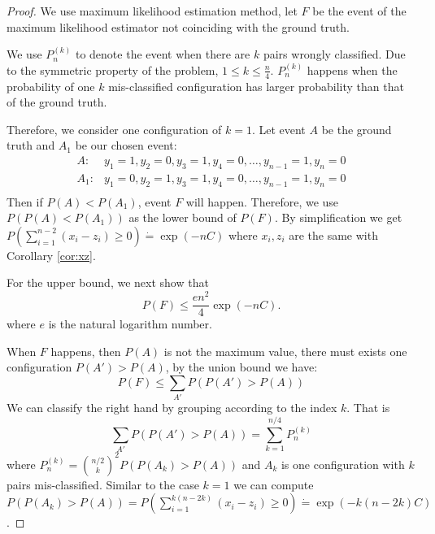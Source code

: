\documentclass{article}
\begin{document}
\begin{proof}
	We use maximum likelihood estimation method, let $F$ be the event of the maximum likelihood estimator not coinciding with the ground truth. 
	
	We use $P_n^{(k)}$ to denote the event when there are $k$ pairs wrongly classified. Due to the symmetric property of the problem, $1\leq k \leq \frac{n}{4}$.
	$P_n^{(k)}$ happens when the probability of one $k$ mis-classified configuration has larger probability than that of the ground truth. 
	
	Therefore, we consider one configuration of $k=1$. Let event $A$ be the ground truth and $A_1$ be our chosen event:
	\begin{align*}
	A: & y_1 = 1, y_2 = 0, y_3 = 1, y_4 = 0, \dots, y_{n-1} = 1, y_n = 0 \\
	A_1: & y_1 = 0, y_2 = 1, y_3 = 1, y_4 = 0, \dots, y_{n-1} = 1, y_n = 0 \\	
	\end{align*}
	Then if $P(A) < P(A_1)$, event $F$ will happen. Therefore, we use $P(P(A) < P(A_1))$ as the lower bound of $P(F)$.
	By simplification we get $P(\sum_{i=1}^{n-2} (x_i - z_i) \geq 0) \dot{=} \exp (-nC)$ where $x_i, z_i$ are the same with Corollary \ref{cor:xz}.
	
	For the upper bound, we next show that 
	\begin{equation}
	P(F) \leq \frac{en^2}{4} \exp(-nC).
	\end{equation}
	where $e$ is the natural logarithm number.
	
	When $F$ happens, then $P(A)$ is not the maximum value, there must exists one configuration $P(A') > P(A)$, by the union bound we have:
	\begin{equation}\label{eq:outsidelemmaboundpf5_IT_ub}
	P(F) \leq \sum_{A'} P(P(A') > P(A))
	\end{equation}
	We can classify the right hand by grouping according to the index $k$. That is
	\begin{equation}\label{eq:with14epsilon_14}
	\sum_{A'} P(P(A') > P(A)) = \sum_{k=1}^{n/4} P_{n}^{(k)}
	\end{equation}
	where $P_{n}^{(k)} = \binom{n/2}{k}^2 P(P(A_k) > P(A))$ and $A_k$ is one configuration with $k$ pairs mis-classified.
	Similar to the case $k=1$ we can compute $P(P(A_k) > P(A)) = P(\sum_{i=1}^{k(n-2k)} (x_i - z_i) \geq 0)\dot{=} \exp(-k(n-2k)C)$.
	

\end{proof}
\end{document}
